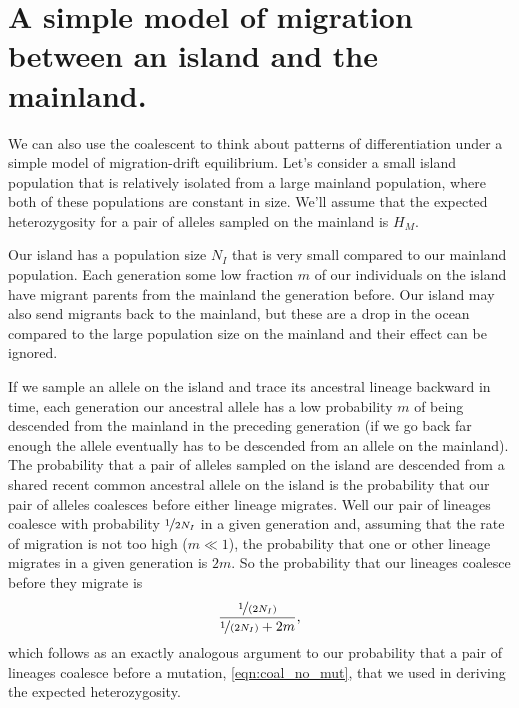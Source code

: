 
\section{A simple model of migration between an island and the mainland.}
We can also use the coalescent to think about patterns of
differentiation under a simple model of migration-drift
equilibrium. Let's consider a small island population that is relatively isolated
from a large mainland population, where both of these populations
are constant in size. We'll assume that the expected heterozygosity
for a pair of alleles sampled on the mainland is $H_M$.

Our island has a population size
$N_{I}$ that is very small compared to our mainland population.
Each generation some low fraction $m$ of our individuals on the
island have migrant parents from the mainland the generation
before. Our island may also send migrants back to the mainland, but
these are a drop in the ocean compared to the large population size on
the mainland and their effect can be ignored.


If we sample an allele on the island and trace its ancestral
lineage backward in time, each generation our ancestral allele has a low
probability $m$ of being descended from the mainland in the preceding
generation (if we go back far enough the allele eventually has to be
descended from an allele on the mainland). The probability that a pair of alleles sampled on the
island are descended from a shared recent common ancestral allele on the island is the
probability that our pair of alleles coalesces before either lineage
migrates. Well our pair of lineages coalesce with probability
$\nicefrac{1}{2N_I} $ in a given generation and, assuming that the rate of migration is not
too high ($m \ll 1$), the probability that one or other lineage
migrates in a given generation is $2m$. So the probability that our
lineages coalesce before they migrate is 
\begin{equation}
\frac{\nicefrac{1}{(2N_I)}}{\nicefrac{1}{(2N_I)} +   2m},
\end{equation}
which follows as an exactly analogous argument to our probability that a pair of
lineages coalesce before a mutation, \eqn \ref{eqn:coal_no_mut}, that we used in deriving the
expected heterozygosity.  

